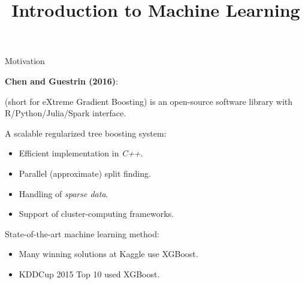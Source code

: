  





\newcommand{\titlefigure}{figure_man/split-finding02.png}
\newcommand{\learninggoals}{
  \item \textcolor{blue}{XXX}
  \item \textcolor{blue}{XXX}
}

\title{Introduction to Machine Learning}
\date{}





\begin{vbframe}{Motivation}

\textbf{Chen and Guestrin (2016)}:

 (short for eXtreme Gradient Boosting) is an open-source software
library with R/Python/Julia/Spark interface.

\lz

A scalable regularized tree boosting system:
\begin{itemize}
  \item Efficient implementation in \emph{C++}.
  \item Parallel (approximate) split finding.
  \item Handling of \emph{sparse data}.
  \item Support of cluster-computing frameworks.
\end{itemize}

\lz

State-of-the-art machine learning method:
\begin{itemize}
  \item Many winning solutions at Kaggle use XGBoost.
  \item KDDCup 2015 Top 10 used XGBoost.
\end{itemize}

\end{vbframe}

